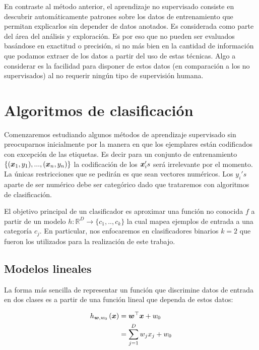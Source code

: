 En contraste al método anterior, el aprendizaje no supervisado consiste en
descubrir automáticamente patrones sobre los datos de entrenamiento que permitan
explicarlos sin depender de datos anotados. Es considerada como parte del área
del análisis y exploración. Es por eso que no pueden ser evaluados basándose en
exactitud o precisión, si no más bien en la cantidad de información que podamos
extraer de los datos a partir del uso de estas técnicas. Algo a considerar es la
facilidad para disponer de estos datos (en comparación a los no supervisados) al
no requerir ningún tipo de supervisión humana.

\section{Algoritmos de clasificación}
\label{lit:algorithms}

Comenzaremos estudiando algunos métodos de aprendizaje supervisado sin
preocuparnos inicialmente por la manera en que los ejemplares están codificados
con excepción de las etiquetas. Es decir para un conjunto de entrenamiento
$\{(\boldsymbol{x}_1, y_1), ..., (\boldsymbol{x}_n, y_n)\}$ la codificación de los
$\boldsymbol{x}_i's$ será irrelevante por el momento. La únicas restricciones que se
pedirán es que sean vectores numéricos. Los $y_i's$ aparte de ser numérico debe
ser categórico dado que trataremos con algoritmos de clasificación.

El objetivo principal de un clasificador es aproximar una función no conocida
$f$ a partir de un modelo $h: \mathbb{R}^D \rightarrow \{c_1,.., c_k\}$ la cual
mapea ejemplos de entrada a una categoría $c_j$. En particular, nos enfocaremos
en clasificadores binarios $k = 2$ que fueron los utilizados para la realización
de este trabajo.

\subsection{Modelos lineales}

La forma más sencilla de representar un función que discrimine datos de entrada
en dos clases es a partir de una función lineal que dependa de estos datos:

\begin{align}
    h_{\boldsymbol{w}, w_0}\left( \boldsymbol{x} \right) &= \boldsymbol{w}^{\top} \boldsymbol{x} + w_0  \label{eq:linear_w_bias}\\
                                           &= \sum_{j = 1 }^{D} w_j x_j + w_0 \label{eq:linear_wo_bias}
\end{align}

